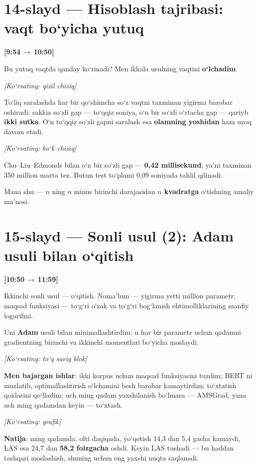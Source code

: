 \documentclass[14pt,a4paper]{extarticle}
\let\origsection\section
\renewcommand{\section}{\Needspace*{9\baselineskip}\origsection}
\newcommand{\timing}[2]{%
   \par\nobreak\noindent\textbf{[#1\,$\to$\,#2]}\par\vspace{0.3em}}
\newcommand{\say}[1]{\textbf{#1}}
\newcommand{\pointto}[1]{\par\vspace{0.3em}\noindent\textit{\small
   [Ko‘rsating: #1]}\par}
\begin{document}
\section*{14-slayd --- Hisoblash tajribasi: vaqt bo‘yicha yutuq}
\timing{9:54}{10:50}

Bu yutuq vaqtda qanday ko‘rinadi? Men ikkala usulning vaqtini \textbf{o‘lchadim}.

\pointto{qizil chiziq}

To‘liq saralashda har bir qo‘shimcha so‘z vaqtni taxminan yigirma barobar oshiradi:
sakkiz so‘zli gap --- to‘qqiz soniya, o‘n bir so‘zli o‘rtacha gap --- qariyb
\textbf{ikki sutka}. O‘n to‘qqiz so‘zli gapni saralash esa \textbf{olamning yoshidan}
ham uzoq davom etadi.

\pointto{ko‘k chiziq}

Chu--Liu--Edmonds bilan o‘n bir so‘zli gap --- \textbf{0,42 millisekund}, ya’ni taxminan
350 million marta tez. Butun test to‘plami 0,09 soniyada tahlil qilinadi.

Mana shu --- $n$ ning $n$ minus birinchi darajasidan \say{$n$ kvadratga} o‘tishning
amaliy ma’nosi.

\section*{15-slayd --- Sonli usul (2): Adam usuli bilan o‘qitish}
\timing{10:50}{11:59}

Ikkinchi sonli usul --- o‘qitish. Noma’lum --- yigirma yetti million parametr,
maqsad funksiyasi --- to‘g‘ri o‘zak va to‘g‘ri bog‘lanish ehtimolliklarining manfiy
logarifmi.

Uni \textbf{Adam} usuli bilan minimallashtirdim: u har bir parametr uchun qadamni
gradientning birinchi va ikkinchi momentlari bo‘yicha moslaydi.

\pointto{to‘q sariq blok}

\textbf{Men bajargan ishlar}: ikki korpus uchun maqsad funksiyasini tuzdim; BERT ni
muzlatib, optimallashtirish o‘lchamini besh barobar kamaytirdim; to‘xtatish qoidasini
qo‘lladim: uch ming qadam yaxshilanish bo‘lmasa --- AMSGrad, yana uch ming qadamdan
keyin --- to‘xtash.

\pointto{grafik}

\say{Natija}: ming qadamda, olti daqiqada, yo‘qotish 14,3 dan 5,4 gacha kamaydi,
LAS esa 24,7 dan \textbf{58,2 foizgacha} oshdi. Keyin LAS tushadi --- bu haddan
tashqari moslashish, shuning uchun eng yaxshi nuqta saqlanadi.
\end{document}
